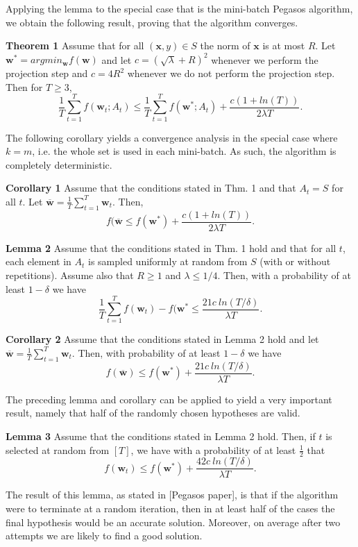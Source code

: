 \documentclass{article}
\begin{document}
Applying the lemma to the special case that is the mini-batch Pegasos algorithm, we obtain the following
result, proving that the algorithm converges.

\textbf{Theorem 1} Assume that for all $(\mathbf{x},y)\in S$ the norm of $\mathbf{x}$ is at most $R$. Let
$\mathbf{w}^*=argmin_{\mathbf{w}}f(\mathbf{w})$ and let $c=(\sqrt{\lambda}+R)^2$ whenever we perform the
projection step and $c=4R^2$ whenever we do not perform the projection step. Then for $T\geq 3$,
$$\frac{1}{T}\sum_{t=1}^Tf(\mathbf{w}_t;A_t)\leq \frac{1}{T}\sum_{t=1}^Tf(\mathbf{w}^*;A_t)+\frac{c(1+ln(T))}{2\lambda T}.$$

The following corollary yields a convergence analysis in the special case where $k=m$, i.e.
the whole set is used in each mini-batch. As such, the algorithm is completely deterministic.

\textbf{Corollary 1} Assume that the conditions stated in Thm. 1 and that $A_t=S$ for all $t$. Let
$\overline{\mathbf{w}}=\frac{1}{T}\sum_{t=1}^T\mathbf{w}_t$. Then,
$$f(\overline{\mathbf{w}}\leq f(\mathbf{w}^*)+\frac{c(1+ln(T))}{2\lambda T}.$$

\textbf{Lemma 2} Assume that the conditions stated in Thm. 1 hold and that for all $t$, each element in $A_t$ is sampled uniformly at random from $S$ (with or without repetitions). Assume also that $R\geq 1$ and $\lambda \leq 1/4$. Then, with a probability of at least $1-\delta$ we have
$$\frac{1}{T}\sum_{t=1}^{T}f(\mathbf{w}_t)-f(\mathbf{w}^*\leq \frac{21c\ ln(T/\delta)}{\lambda T}.$$

\textbf{Corollary 2} Assume that the conditions stated in Lemma 2 hold and let $\overline{\mathbf{w}}=\frac{1}{T}\sum_{t=1}^T\mathbf{w}_t$. Then, with probability of at least $1-\delta$ we have
$$f(\overline{\mathbf{w}})\leq f(\mathbf{w}^*)+\frac{21c\ ln(T/\delta)}{\lambda T}.$$

The preceding lemma and corollary can be applied to yield a very important result, namely that half
of the randomly chosen hypotheses are valid.

\textbf{Lemma 3} Assume that the conditions stated in Lemma 2 hold. Then, if $t$ is selected at random
from $[T]$, we have with a probability of at least $\frac{1}{2}$ that
$$f(\mathbf{w}_t)\leq f(\mathbf{w}^*)+\frac{42c\ ln(T/\delta)}{\lambda T}.$$

The result of this lemma, as stated in [Pegasos paper], is that if the algorithm were to terminate at a
random iteration, then in at least half of the cases the final hypothesis would be an accurate solution.
Moreover, on average after two attempts we are likely to find a good solution.
\end{document}
